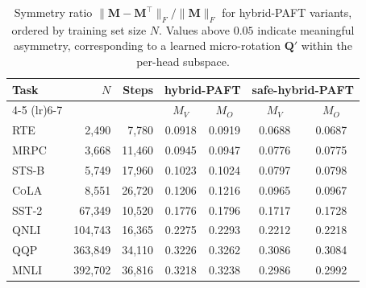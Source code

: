 \begin{table}[t]
\centering
\small
\setlength{\tabcolsep}{4pt}
\caption{Symmetry ratio $\|\mathbf{M} - \mathbf{M}^\top\|_F / \|\mathbf{M}\|_F$ for hybrid-PAFT variants, ordered by training set size $N$. Values above $0.05$ indicate meaningful asymmetry, corresponding to a learned micro-rotation $\mathbf{Q}'$ within the per-head subspace.}
\label{tab:asymmetry}
\begin{tabular}{lrrcccc}
\toprule
\textbf{Task} & $N$ & \textbf{Steps} & \multicolumn{2}{c}{\textbf{hybrid-PAFT}} & \multicolumn{2}{c}{\textbf{safe-hybrid-PAFT}} \\
\cmidrule(lr){4-5} \cmidrule(lr){6-7}
 & & & $M_V$ & $M_O$ & $M_V$ & $M_O$ \\
\midrule
\textsc{RTE} & 2,490 & 7,780 & 0.0918 & 0.0919 & 0.0688 & 0.0687 \\
\textsc{MRPC} & 3,668 & 11,460 & 0.0945 & 0.0947 & 0.0776 & 0.0775 \\
\textsc{STS-B} & 5,749 & 17,960 & 0.1023 & 0.1024 & 0.0797 & 0.0798 \\
\textsc{CoLA} & 8,551 & 26,720 & 0.1206 & 0.1216 & 0.0965 & 0.0967 \\
\textsc{SST-2} & 67,349 & 10,520 & 0.1776 & 0.1796 & 0.1717 & 0.1728 \\
\textsc{QNLI} & 104,743 & 16,365 & 0.2275 & 0.2293 & 0.2212 & 0.2218 \\
\textsc{QQP} & 363,849 & 34,110 & 0.3226 & 0.3262 & 0.3086 & 0.3084 \\
\textsc{MNLI} & 392,702 & 36,816 & 0.3218 & 0.3238 & 0.2986 & 0.2992 \\
\bottomrule
\end{tabular}
\end{table}